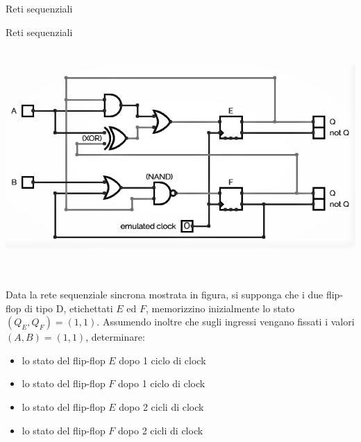 \documentclass[11pt]{article}
\begin{document}
\begin{quiz}{Reti sequenziali}
\begin{cloze}[points=1,shuffle=false]{Reti sequenziali}
    \includegraphics[height=9cm]{figures/seq_1.png}
    
    Data la rete sequenziale sincrona mostrata in figura, si supponga che i due flip-flop di tipo D,
    etichettati $E$ ed $F$, memorizzino inizialmente lo stato $(Q_E,Q_F) = (1,1)$.
    Assumendo inoltre che sugli ingressi vengano fissati i valori $(A,B)=(1,1)$,
    determinare:    
    \begin{itemize}
    \item lo stato del flip-flop $E$ dopo 1 ciclo di clock 
    \item lo stato del flip-flop $F$ dopo 1 ciclo di clock 
    \item lo stato del flip-flop $E$ dopo 2 cicli di clock 
    \item lo stato del flip-flop $F$ dopo 2 cicli di clock 
    \end{itemize}
\end{cloze}



\end{quiz}
\end{document}

